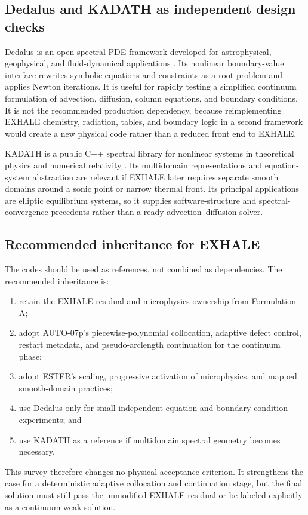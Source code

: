 \documentclass[english,a4paper]{my_memo}
\begin{document}
\subsection{Dedalus and KADATH as independent design checks}

Dedalus is an open spectral PDE framework developed for astrophysical,
geophysical, and fluid-dynamical applications \cite{Burns2020}.  Its nonlinear
boundary-value interface rewrites symbolic equations and constraints as a root
problem and applies Newton iterations.  It is useful for rapidly testing a
simplified continuum formulation of advection, diffusion, column equations,
and boundary conditions.  It is not the recommended production dependency,
because reimplementing EXHALE chemistry, radiation, tables, and boundary logic
in a second framework would create a new physical code rather than a reduced
front end to EXHALE.

KADATH is a public C++ spectral library for nonlinear systems in theoretical
physics and numerical relativity \cite{Grandclement2010}.  Its multidomain
representations and equation-system abstraction are relevant if EXHALE later
requires separate smooth domains around a sonic point or narrow thermal front.
Its principal applications are elliptic equilibrium systems, so it supplies
software-structure and spectral-convergence precedents rather than a ready
advection--diffusion solver.

\subsection{Recommended inheritance for EXHALE}

The codes should be used as references, not combined as dependencies.  The
recommended inheritance is:
\begin{enumerate}
\item retain the EXHALE residual and microphysics ownership from Formulation A;
\item adopt AUTO-07p's piecewise-polynomial collocation, adaptive defect control,
  restart metadata, and pseudo-arclength continuation for the continuum phase;
\item adopt ESTER's scaling, progressive activation of microphysics, and mapped
  smooth-domain practices;
\item use Dedalus only for small independent equation and boundary-condition
  experiments; and
\item use KADATH as a reference if multidomain spectral geometry becomes
  necessary.
\end{enumerate}
This survey therefore changes no physical acceptance criterion.  It strengthens
the case for a deterministic adaptive collocation and continuation stage, but
the final solution must still pass the unmodified EXHALE residual or be labeled
explicitly as a continuum weak solution.
\end{document}
